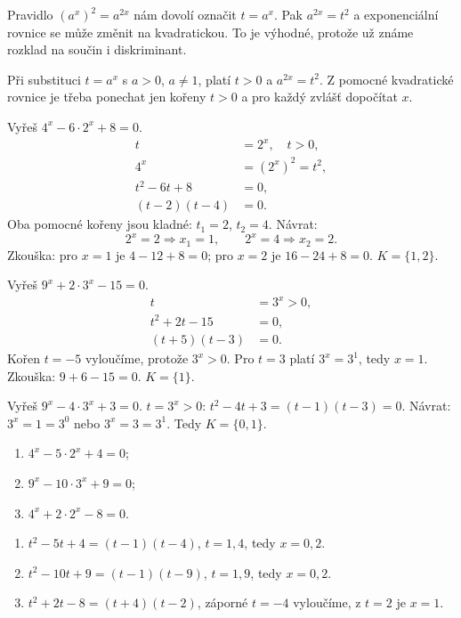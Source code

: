 \documentclass[11pt,a4paper]{article}
\begin{document}
Pravidlo $(a^x)^2=a^{2x}$ nám dovolí označit $t=a^x$. Pak $a^{2x}=t^2$ a exponenciální rovnice se může změnit na kvadratickou. To je výhodné, protože už známe rozklad na součin i diskriminant.
\begin{zadaniBox}[title={Věta - Kvadratická substituce}]
Při substituci $t=a^x$ s $a>0$, $a\ne1$, platí $t>0$ a $a^{2x}=t^2$. Z pomocné kvadratické rovnice je třeba ponechat jen kořeny $t>0$ a pro každý zvlášť dopočítat $x$.
\end{zadaniBox}
\begin{prikladReseniBox}[title={Příklad 1}]
Vyřeš $4^x-6\cdot2^x+8=0$.
\tcblower
\[\begin{aligned}t&=2^x,\quad t>0,\\4^x&=(2^x)^2=t^2,\\t^2-6t+8&=0,\\(t-2)(t-4)&=0.\end{aligned}\]
Oba pomocné kořeny jsou kladné: $t_1=2$, $t_2=4$. Návrat:
\[2^x=2\Rightarrow x_1=1,\qquad 2^x=4\Rightarrow x_2=2.\]
Zkouška: pro $x=1$ je $4-12+8=0$; pro $x=2$ je $16-24+8=0$. $K=\{1,2\}$.
\end{prikladReseniBox}
\begin{prikladReseniBox}[title={Příklad 2}]
Vyřeš $9^x+2\cdot3^x-15=0$.
\tcblower
\[\begin{aligned}t&=3^x>0,\\t^2+2t-15&=0,\\(t+5)(t-3)&=0.\end{aligned}\]
Kořen $t=-5$ vyloučíme, protože $3^x>0$. Pro $t=3$ platí $3^x=3^1$, tedy $x=1$. Zkouška: $9+6-15=0$. $K=\{1\}$.
\end{prikladReseniBox}
\begin{prikladReseniBox}[title={Příklad 3}]
Vyřeš $9^x-4\cdot3^x+3=0$.
\tcblower
$t=3^x>0$: $t^2-4t+3=(t-1)(t-3)=0$. Návrat: $3^x=1=3^0$ nebo $3^x=3=3^1$. Tedy $K=\{0,1\}$.
\end{prikladReseniBox}
\begin{zadaniReseniBox}[title={Samostatná práce 1}]
\begin{enumerate}[label=\alph*)]
\item $4^x-5\cdot2^x+4=0$;
\item $9^x-10\cdot3^x+9=0$;
\item $4^x+2\cdot2^x-8=0$.
\end{enumerate}
\tcblower
\begin{enumerate}[label=\alph*)]
\item $t^2-5t+4=(t-1)(t-4)$, $t=1,4$, tedy $x=0,2$.
\item $t^2-10t+9=(t-1)(t-9)$, $t=1,9$, tedy $x=0,2$.
\item $t^2+2t-8=(t+4)(t-2)$, záporné $t=-4$ vyloučíme, z $t=2$ je $x=1$.
\end{enumerate}
\end{zadaniReseniBox}
\end{document}
